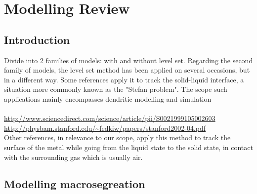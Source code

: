 \chapter{Modelling Review}
\begin{nolinkcolors} 
\minitoc
\end{nolinkcolors}
\newpage

\section{Introduction}
Divide into 2 families of models: with and without level set. Regarding the second family of models,
the level set method has been applied on several occasions, but in a different way. Some references
apply it to track the solid-liquid interface, a situation more commonly known as the "Stefan problem".
The scope such applications mainly encompasses dendritic modelling and simulation \\
 \\
\url{http://www.sciencedirect.com/science/article/pii/S0021999105002603} \\
\url{http://physbam.stanford.edu/~fedkiw/papers/stanford2002-04.pdf} \\
Other references, in relevance to our scope, apply this method to track the surface of the metal
while going from the liquid state to the solid state, in contact with the surrounding gas which is usually air.
\section{Modelling macrosegreation}
